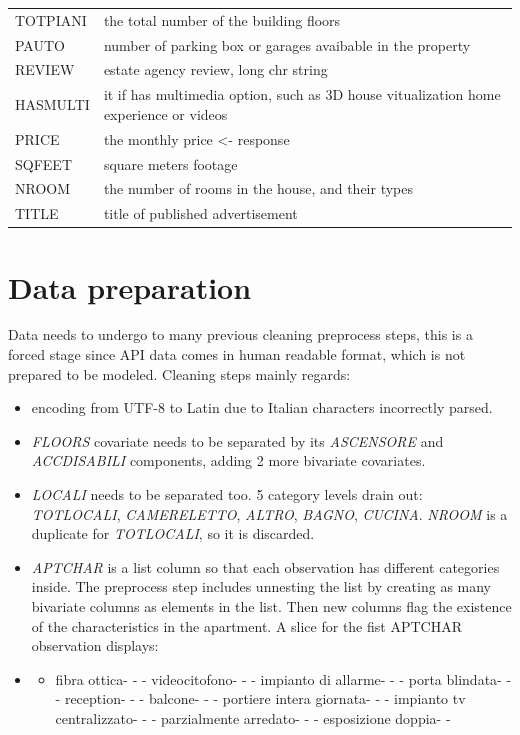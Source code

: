 \documentclass[
  12pt,
  a4paper,
  oneside]{book}
\providecommand{\tightlist}{%
  \setlength{\itemsep}{0pt}\setlength{\parskip}{0pt}}
\theoremstyle{definition}
\theoremstyle{definition}
\theoremstyle{definition}
\theoremstyle{remark}
\begin{document}
\begin{longtable}{ll}
\addlinespace
TOTPIANI & the total number of the building floors\\
PAUTO & number of parking box or garages avaibable in the property\\
REVIEW & estate agency review, long chr string\\
HASMULTI & it if has multimedia option, such as 3D house vitualization home experience or videos\\
PRICE & the monthly price <- response\\
\addlinespace
SQFEET & square meters footage\\
NROOM & the number of rooms in the house, and their types\\
TITLE & title of published advertisement\\
\bottomrule
\end{longtable}

\hypertarget{data-preparation}{%
\section{Data preparation}\label{data-preparation}}

Data needs to undergo to many previous cleaning preprocess steps, this is a forced stage since API data comes in human readable format, which is not prepared to be modeled. Cleaning steps mainly regards:

\begin{itemize}
\item
  encoding from UTF-8 to Latin due to Italian characters incorrectly parsed.
\item
  \emph{FLOORS} covariate needs to be separated by its \emph{ASCENSORE} and \emph{ACCDISABILI} components, adding 2 more bivariate covariates.
\item
  \emph{LOCALI} needs to be separated too. 5 category levels drain out: \emph{TOTLOCALI}, \emph{CAMERELETTO}, \emph{ALTRO}, \emph{BAGNO}, \emph{CUCINA}. \emph{NROOM} is a duplicate for \emph{TOTLOCALI}, so it is discarded.
\item
  \emph{APTCHAR} is a list column so that each observation has different categories inside. The preprocess step includes unnesting the list by creating as many bivariate columns as elements in the list. Then new columns flag the existence of the characteristics in the apartment. A slice for the fist APTCHAR observation displays:
\item
  \begin{itemize}
  \tightlist
  \item
    fibra ottica- - - videocitofono- - - impianto di allarme- - - porta blindata- - - reception- - - balcone- - - portiere intera giornata- - - impianto tv centralizzato- - - parzialmente arredato- - - esposizione doppia- -
  \end{itemize}
\end{itemize}
\end{document}
